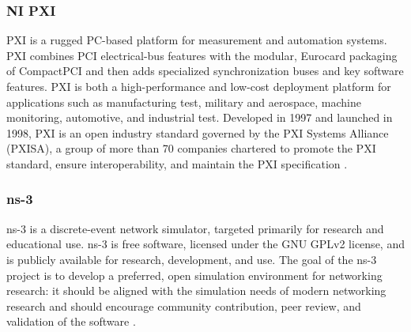 \subsubsection{NI PXI}\label{sec:chap2_lte_emu_pxi}

PXI is a rugged PC-based platform for measurement and automation systems. PXI combines PCI electrical-bus features with the modular, Eurocard packaging of CompactPCI and then adds specialized synchronization buses and key software features. PXI is both a high-performance and low-cost deployment platform for applications such as manufacturing test, military and aerospace, machine monitoring, automotive, and industrial test. Developed in 1997 and launched in 1998, PXI is an open industry standard governed by the PXI Systems Alliance (PXISA), a group of more than 70 companies chartered to promote the PXI standard, ensure interoperability, and maintain the PXI specification \cite{ni_pxi_whatis}.

\subsubsection{ns-3}\label{sec:chap2_lte_emu_ns3}

ns-3 is a discrete-event network simulator, targeted primarily for research and educational use. ns-3 is free software, licensed under the GNU GPLv2 license, and is publicly available for research, development, and use.
The goal of the ns-3 project is to develop a preferred, open simulation environment for networking research: it should be aligned with the simulation needs of modern networking research and should encourage community contribution, peer review, and validation of the software \cite{ns3_whatis}.
















